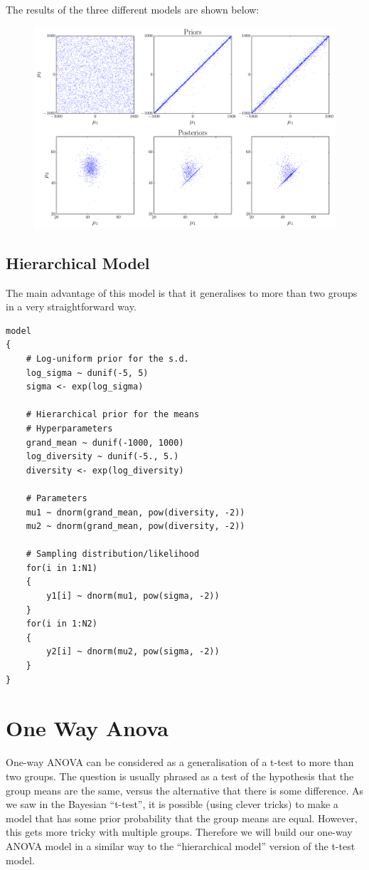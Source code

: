 The results of the three different models are shown below:
\begin{figure}
\begin{center}
\includegraphics[scale=0.6]{Figures/ttest.pdf}
\end{center}
\end{figure}


\subsection{Hierarchical Model}
The main advantage of this model is that it generalises to more than two groups
in a very straightforward way.
\begin{framed}
\begin{verbatim}
model
{
    # Log-uniform prior for the s.d.
    log_sigma ~ dunif(-5, 5)
    sigma <- exp(log_sigma)

    # Hierarchical prior for the means
    # Hyperparameters
    grand_mean ~ dunif(-1000, 1000)
    log_diversity ~ dunif(-5., 5.)
    diversity <- exp(log_diversity)

    # Parameters
    mu1 ~ dnorm(grand_mean, pow(diversity, -2))
    mu2 ~ dnorm(grand_mean, pow(diversity, -2))

    # Sampling distribution/likelihood
    for(i in 1:N1)
    {
        y1[i] ~ dnorm(mu1, pow(sigma, -2))
    }
    for(i in 1:N2)
    {
        y2[i] ~ dnorm(mu2, pow(sigma, -2))
    }
}

\end{verbatim}
\end{framed}



\section{One Way Anova}
One-way ANOVA can be considered as a generalisation of a t-test to more than
two groups. The question is usually phrased as a test of the hypothesis that
the group means are the same, versus the alternative that there is some difference.
As we saw in the Bayesian ``t-test'', it is possible (using clever tricks) to
make a model that has some prior probability that the group means are equal.
However, this gets more tricky with multiple groups. Therefore we will build our
one-way ANOVA model in a similar way to the ``hierarchical model'' version of the
t-test model.


